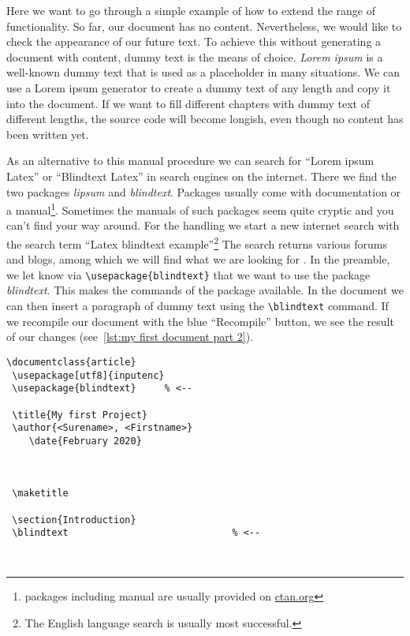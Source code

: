 Here we want to go through a simple example of how to extend the range of functionality. So far, our document has no content. Nevertheless, we would like to check the appearance of our future text. To achieve this without generating a document with content, dummy text is the means of choice. \textit{Lorem ipsum} is a well-known dummy text that is used as a placeholder in many situations. We can use a Lorem ipsum generator \cite{Jones.2005} to create a dummy text of any length and copy it into the document. If we want to fill different chapters with dummy text of different lengths, the \Latex source code will become longish, even though no content has been written yet. 

As an alternative to this manual procedure we can search for \enquote{Lorem ipsum Latex} or \enquote{Blindtext Latex} in search engines on the internet. There we find the two packages \textit{lipsum} and \textit{blindtext}. Packages usually come with documentation or a manual\footnote{packages including manual are usually provided on \href{https://ctan.org/}{ctan.org}}. Sometimes the manuals of such packages seem quite cryptic and you can't find your way around. For the handling we start a new internet search with the search term \enquote{Latex blindtext example}\footnote{The English language search is usually most successful.} The search returns various forums and blogs, among which we will find what we are looking for \cite{tom.2011}. In the preamble, we let \Latex know via \lstinline|\usepackage{blindtext}| that we want to use the package \textit{blindtext}. This makes the commands of the package available. In the document we can then insert a paragraph of dummy text using the \lstinline|\blindtext| command. If we recompile our document with the blue \enquote{Recompile} button, we see the result of our changes (see~\autoref{lst:my first document part 2}).
 
\begin{lstlisting}[caption={My first \Latex Document, Part 2 \label{lst:my first document part 2}}, float]
 \documentclass{article}
 \usepackage[utf8]{inputenc}
 \usepackage{blindtext}		% <--
 
 \title{My first Project}
 \author{<Surename>, <Firstname>}
	\date{February 2020}
 
 
 
 \maketitle
 
 \section{Introduction}
 \blindtext 							% <--
 
 
\end{lstlisting}

